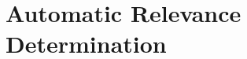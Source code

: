 \section{Automatic Relevance Determination}
 \begin{figure}[!ht]
	\begin{floatrow}
\end{floatrow}
\end{figure}
